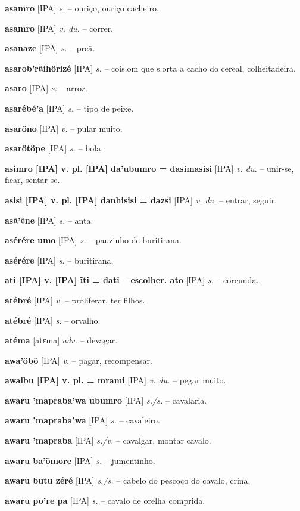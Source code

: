 \textbf{asamro} [IPA] \textit{s.} -- ouriço, ouriço cacheiro.

\textbf{asamro} [IPA] \textit{v. du.} -- correr.

\textbf{asanaze} [IPA] \textit{s.} -- preã.

\textbf{asarob'rãihörizé} [IPA] \textit{s.} -- cois.om que s.orta a cacho do cereal, colheitadeira.

\textbf{asaro} [IPA] \textit{s.} -- arroz.

\textbf{asarébé'a} [IPA] \textit{s.} -- tipo de peixe.

\textbf{asaröno} [IPA] \textit{v.} -- pular muito.

\textbf{asarötöpe} [IPA] \textit{s.} -- bola.

\textbf{asimro [IPA] v. pl. [IPA] da'ubumro = dasimasisi} [IPA] \textit{v. du.} -- unir-se, ficar, sentar-se.

\textbf{asisi [IPA] v. pl. [IPA] danhisisi = dazsi} [IPA] \textit{v. du.} -- entrar, seguir.

\textbf{asã'ẽne} [IPA] \textit{s.} -- anta.

\textbf{asérére umo} [IPA] \textit{s.} -- pauzinho de buritirana.

\textbf{asérére} [IPA] \textit{s.} -- buritirana.

\textbf{ati [IPA] v. [IPA] ĩti = dati -- escolher. ato} [IPA] \textit{s.} -- corcunda.

\textbf{atébré} [IPA] \textit{v.} -- proliferar, ter filhos.

\textbf{atébré} [IPA] \textit{s.} -- orvalho.

\textbf{atéma} [atɛma] \textit{adv.} -- devagar.

\textbf{awa'öbö} [IPA] \textit{v.} -- pagar, recompensar.

\textbf{awaibu [IPA] v. pl. = mrami} [IPA] \textit{v. du.} -- pegar muito.

\textbf{awaru 'mapraba'wa ubumro} [IPA] \textit{s./s.} -- cavalaria.

\textbf{awaru 'mapraba'wa} [IPA] \textit{s.} -- cavaleiro.

\textbf{awaru 'mapraba} [IPA] \textit{s./v.} -- cavalgar, montar cavalo.

\textbf{awaru ba'ömore} [IPA] \textit{s.} -- jumentinho.

\textbf{awaru butu zéré} [IPA] \textit{s./s.} -- cabelo do pescoço do cavalo, crina.

\textbf{awaru po're pa} [IPA] \textit{s.} -- cavalo de orelha comprida.

